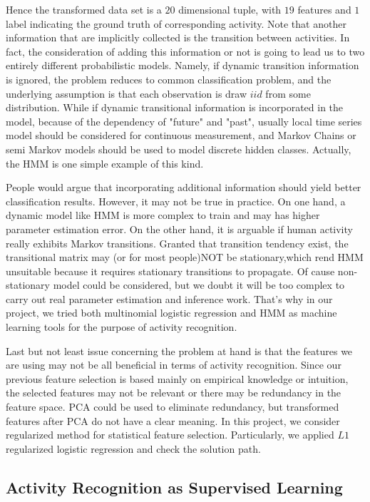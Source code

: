 Hence the transformed data set is a $20$ dimensional tuple, with $19$ features and $1$ label indicating the ground truth of corresponding activity. Note that another information that are implicitly collected is the transition between activities. In fact, the consideration of adding this information or not is going to lead us to two entirely different probabilistic models. Namely, if dynamic transition information is ignored, the problem reduces to common classification problem, and the underlying assumption is that each observation is draw $iid$ from some distribution. While if dynamic transitional information is incorporated in the model, because of the dependency of "future" and "past", usually local time series model should be considered for continuous measurement, and Markov Chains or semi Markov models should be used to model discrete hidden classes. Actually, the HMM is one simple example of this kind. 

People would argue that incorporating additional information should yield better classification results. However, it may not be true in practice. On one hand, a dynamic model like HMM is more complex to train and may has higher parameter estimation error. On the other hand, it is arguable if human activity really exhibits Markov transitions. Granted that transition tendency exist, the transitional matrix may (or for most people)NOT be stationary,which rend HMM unsuitable because it requires stationary transitions to propagate. Of cause non-stationary model could be considered, but we doubt it will be too complex to carry out real parameter estimation and inference work. That's why in our project, we tried both multinomial logistic regression and HMM as machine learning tools for the purpose of activity recognition.  

Last but not least issue concerning the problem at hand is that the features we are using may not be all beneficial in terms of activity recognition. Since our previous feature selection is based mainly on empirical knowledge or intuition, the selected features may not be relevant or there may be redundancy in the feature space. PCA could be used to eliminate redundancy, but transformed features after PCA do not have a clear meaning. In this project, we consider regularized method for statistical feature selection. Particularly, we applied $L1$ regularized logistic regression and check the solution path. 


\subsection{Activity Recognition as Supervised Learning}
\label{subsec: learning}

